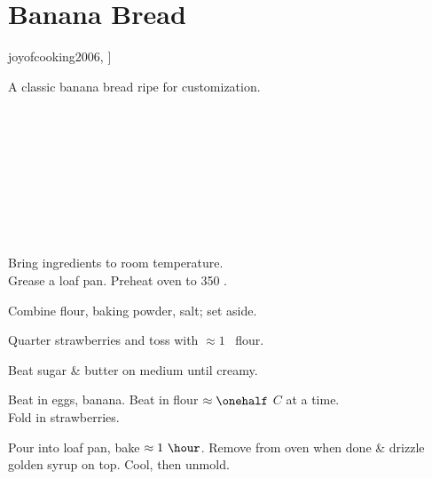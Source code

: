 \section{Banana Bread}

\begin{recipestats}[
        servings=1 loaf,
        preptime=30 \minute,
        bakingtime=1 \hour,
        source=Mike \& Jane,
        original=\citetitle{joyofcooking2006}~\cite[p.~628]{joyofcooking2006},
    ]
\end{recipestats}

\begin{recipeabstract}
    A classic banana bread ripe for customization.
\end{recipeabstract}

\begin{ingredientcolumns}
    \begin{ingredientblock}
        \\
        \\
        \\
        \\
    \end{ingredientblock}
    \begin{ingredientblock}
        \\
        \\
        \\
    \end{ingredientblock}
\end{ingredientcolumns}

\begin{preparation}
\item Bring ingredients to room temperature.\\
    Grease a loaf pan.
    Preheat oven to 350 \Fahrenheit.

\item Combine flour, baking powder, salt; set aside.

\item Quarter strawberries and toss with $\approx1$ \Tablespoon~flour.

\item Beat sugar \& butter on medium until creamy.

\item Beat in eggs, banana.
    Beat in flour $\approx \onehalf$ $C$ at a time.\\
    Fold in strawberries.

\item Pour into loaf pan, bake $\approx1~\hour$.
    Remove from oven when done \& drizzle golden syrup on top.
    Cool, then unmold.
\end{preparation}

